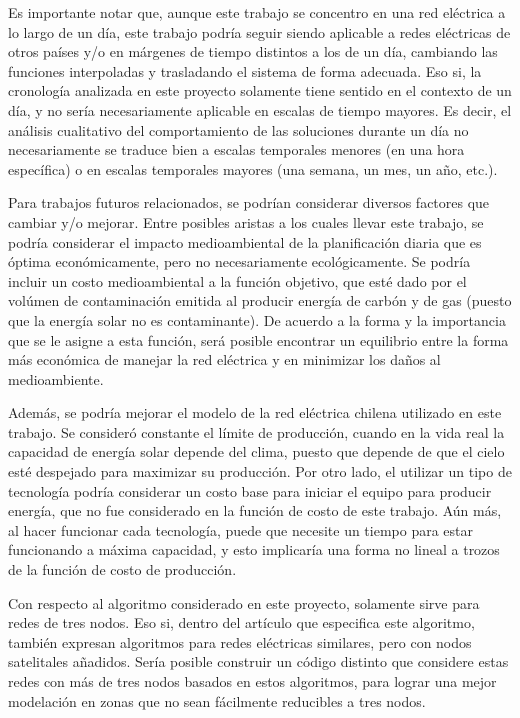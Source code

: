 \documentclass[12pt,twoside]{article}
\begin{document}
	\hspace{1cm} Es importante notar que, aunque este trabajo se concentro en una red el\'ectrica a lo largo de un d\'ia, este trabajo podr\'ia seguir siendo aplicable a redes el\'ectricas de otros pa\'ises y/o en m\'argenes de tiempo distintos a los de un d\'ia, cambiando las funciones interpoladas y trasladando el sistema de forma adecuada. Eso si, la cronolog\'ia analizada en este proyecto solamente tiene sentido en el contexto de un d\'ia, y no ser\'ia necesariamente aplicable en escalas de tiempo mayores. Es decir, el an\'alisis cualitativo del comportamiento de las soluciones durante un d\'ia no necesariamente se traduce bien a escalas temporales menores (en una hora espec\'ifica) o en escalas temporales mayores (una semana, un mes, un a\~{n}o, etc.).
	
	\hspace{1cm} Para trabajos futuros relacionados, se podr\'ian considerar diversos factores que cambiar y/o mejorar. Entre posibles aristas a los cuales llevar este trabajo, se podr\'ia considerar el impacto medioambiental de la planificaci\'on diaria que es \'optima econ\'omicamente, pero no necesariamente ecol\'ogicamente. Se podr\'ia incluir un costo medioambiental a la funci\'on objetivo, que est\'e dado por el vol\'umen de contaminaci\'on emitida al producir energ\'ia de carb\'on y de gas (puesto que la energ\'ia solar no es contaminante). De acuerdo a la forma y la importancia que se le asigne a esta funci\'on, ser\'a posible encontrar un equilibrio entre la forma m\'as econ\'omica de manejar la red el\'ectrica y en minimizar los da\~{n}os al medioambiente.
	
	\hspace{1cm} Adem\'as, se podr\'ia mejorar el modelo de la red el\'ectrica chilena utilizado en este trabajo. Se consider\'o constante el l\'imite de producci\'on, cuando en la vida real la capacidad de energ\'ia solar depende del clima, puesto que depende de que el cielo est\'e despejado para maximizar su producci\'on. Por otro lado, el utilizar un tipo de tecnolog\'ia podr\'ia considerar un costo base para iniciar el equipo para producir energ\'ia, que no fue considerado en la funci\'on de costo de este trabajo. A\'un m\'as, al hacer funcionar cada tecnolog\'ia, puede que necesite un tiempo para estar funcionando a m\'axima capacidad, y esto implicar\'ia una forma no lineal a trozos de la funci\'on de costo de producci\'on.
	
	\hspace{1cm} Con respecto al algoritmo considerado en este proyecto, solamente sirve para redes de tres nodos. Eso si, dentro del art\'iculo que especifica este algoritmo, tambi\'en expresan algoritmos para redes el\'ectricas similares, pero con nodos satelitales a\~{n}adidos. Ser\'ia posible construir un c\'odigo distinto que considere estas redes con m\'as de tres nodos basados en estos algoritmos, para lograr una mejor modelaci\'on en zonas que no sean f\'acilmente reducibles a tres nodos.
	
\end{document}
